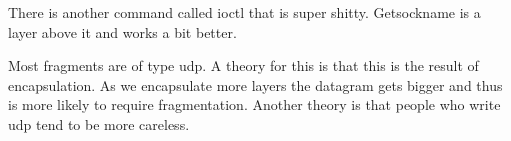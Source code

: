 \documentclass[12pt]{article}
\begin{document}


There is another command called ioctl that is super shitty. Getsockname is a layer above it and works a bit better. 


Most fragments are of type udp. A theory for this is that this is the result of encapsulation. As we encapsulate more layers the datagram gets bigger and thus is more likely to require fragmentation. Another theory is that people who write udp tend to be more careless.



\end{document}
